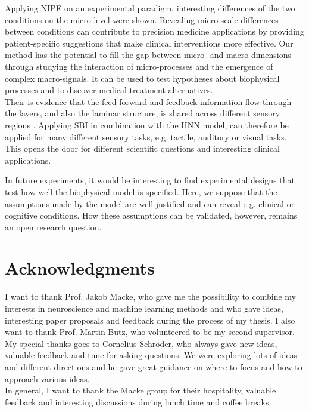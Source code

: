 \documentclass[12pt]{extreport}
\begin{document}
Applying NIPE on an experimental paradigm, interesting differences of the two conditions on the micro-level were shown. Revealing micro-scale differences between conditions can contribute to precision medicine applications by providing patient-specific suggestions that make clinical interventions more effective. Our method has the potential to fill the gap between micro- and macro-dimensions through studying the interaction of micro-processes and the emergence of complex macro-signals. It can be used to test hypotheses about biophysical processes and to discover medical treatment alternatives. \\

Their is evidence that the feed-forward and feedback information flow through the layers, and also the laminar structure, is shared across different sensory regions \citep{kohl_neural_2021, atencio2010columnar}. Applying SBI in combination with the HNN model, can therefore be applied for many different sensory tasks, e.g. tactile, auditory or visual tasks. This opens the door for different scientific questions and interesting clinical applications. 

In future experiments, it would be interesting to find experimental designs that test how well the biophysical model is specified. Here, we suppose that the assumptions made by the model are well justified and can reveal e.g. clinical or cognitive conditions. How these assumptions can be validated, however, remains an open research question.


\chapter*{Acknowledgments}
I want to thank Prof. Jakob Macke, who gave me the possibility to combine my interests in neuroscience and machine learning methods and who gave ideas, interesting paper proposals and feedback during the process of my thesis. I also want to thank Prof. Martin Butz, who volunteered to be my second supervisor. \\

My special thanks goes to Cornelius Schröder, who always gave new ideas, valuable feedback and time for asking questions. We were exploring lots of ideas and different directions and he gave great guidance on where to focus and how to approach various ideas. \\

In general, I want to thank the Macke group for their hospitality, valuable feedback and interesting discussions during lunch time and coffee breaks. 
\end{document}
